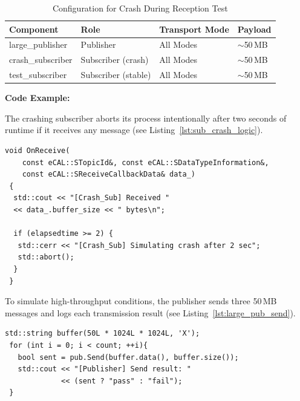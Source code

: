 \begin{table}[H]
	\centering
	\begin{tabular}{@{}llll@{}}
		\toprule
		\textbf{Component} & \textbf{Role}       & \textbf{Transport Mode} & \textbf{Payload} \\
		\midrule
		large\_publisher   & Publisher           & All Modes               & $\sim$50\,MB     \\
		crash\_subscriber  & Subscriber (crash)  & All Modes               & $\sim$50\,MB     \\
		test\_subscriber   & Subscriber (stable) & All Modes               & $\sim$50\,MB     \\
		\bottomrule
	\end{tabular}
	\caption{Configuration for Crash During Reception Test}
	\label{tab:sub_crash_receive}
\end{table}

\vspace{0.5em}
\textbf{Code Example:}

The crashing subscriber aborts its process intentionally after two seconds of runtime if it receives any message (see Listing~\ref{lst:sub_crash_logic}).

\begin{lstlisting}[style=cppstyle, caption={Crash condition inside subscriber receive callback}, label={lst:sub_crash_logic}, captionpos=b]
 void OnReceive(
    const eCAL::STopicId&, const eCAL::SDataTypeInformation&,
    const eCAL::SReceiveCallbackData& data_)
 {
  std::cout << "[Crash_Sub] Received " 
  << data_.buffer_size << " bytes\n";
    		
  if (elapsedtime >= 2) {
   std::cerr << "[Crash_Sub] Simulating crash after 2 sec";
   std::abort();
  }
 }

\end{lstlisting}

To simulate high-throughput conditions, the publisher sends three 50\,MB messages and logs each transmission result (see Listing~\ref{lst:large_pub_send}).

\begin{lstlisting}[style=cppstyle, caption={Large message publisher with send confirmation}, label={lst:large_pub_send}, captionpos=b]
 std::string buffer(50L * 1024L * 1024L, 'X');
 for (int i = 0; i < count; ++i){
   bool sent = pub.Send(buffer.data(), buffer.size());
   std::cout << "[Publisher] Send result: " 
             << (sent ? "pass" : "fail");
 }
\end{lstlisting}

